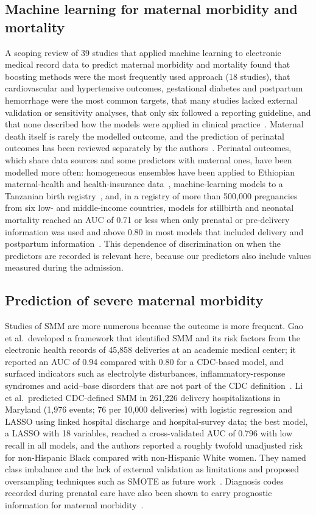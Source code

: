 \documentclass[healthcare,article,submit,pdftex,moreauthors]{Definitions/mdpi}
\begin{document}
\subsection{Machine learning for maternal morbidity and mortality}
A scoping review of 39 studies that applied machine learning to electronic medical
record data to predict maternal morbidity and mortality found that boosting methods
were the most frequently used approach (18 studies), that cardiovascular and
hypertensive outcomes, gestational diabetes and postpartum hemorrhage were the most
common targets, that many studies lacked external validation or sensitivity analyses,
that only six followed a reporting guideline, and that none described how the models
were applied in clinical practice~\cite{Vasudevan2025Scoping}. Maternal death itself is
rarely the modelled outcome, and the prediction of perinatal outcomes has been
reviewed separately by the authors~\cite{gutierrezjimenez2026artificial}. Perinatal outcomes, which share
data sources and some predictors with maternal ones, have been modelled more often: homogeneous ensembles have been applied to
Ethiopian maternal-health and health-insurance data~\cite{Bogale2022Perinatal}, machine-learning models to a Tanzanian birth
registry~\cite{Mboya2020Perinatal}, and, in a registry of more than 500{,}000 pregnancies from six low- and middle-income
countries, models for stillbirth and neonatal mortality reached an AUC of 0.71 or less when only prenatal or pre-delivery
information was used and above 0.80 in most models that included delivery and postpartum information~\cite{Shukla2020Perinatal}. This dependence of
discrimination on when the predictors are recorded is relevant here, because our predictors also include values measured during the admission.

\subsection{Prediction of severe maternal morbidity}
Studies of SMM are more numerous because the outcome is more frequent. Gao et al.\
developed a framework that identified SMM and its risk factors from the electronic
health records of 45{,}858 deliveries at an academic medical center; it reported an AUC
of 0.94 compared with 0.80 for a CDC-based model, and surfaced indicators such as
electrolyte disturbances, inflammatory-response syndromes and acid--base disorders
that are not part of the CDC definition~\cite{Gao2019SMM}. Li et al.\ predicted
CDC-defined SMM in 261{,}226 delivery hospitalizations in Maryland (1{,}976 events;
76 per 10{,}000 deliveries) with logistic regression and LASSO using linked hospital
discharge and hospital-survey data; the best model, a LASSO with 18 variables, reached a
cross-validated AUC of 0.796 with low recall in all models, and the authors reported
a roughly twofold unadjusted risk for non-Hispanic Black compared with non-Hispanic White
women. They named class imbalance and the lack of external validation as limitations
and proposed oversampling techniques such as SMOTE as future work~\cite{Li2025Maryland}.
Diagnosis codes recorded during prenatal care have also been shown to carry
prognostic information for maternal morbidity~\cite{Clapp2021Prenatal}.
\end{document}
